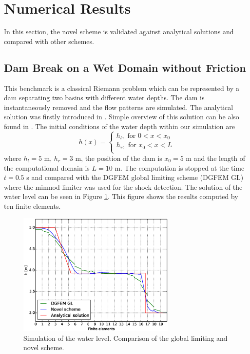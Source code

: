 \section{Numerical Results}
In this section, the novel scheme is validated against analytical solutions and compared with other schemes.

\subsection{Dam Break on a Wet Domain without Friction}\label{DBwet}
This benchmark is a classical Riemann problem which can be represented by a dam separating two basins with different water depths. The dam is instantaneously removed and the flow patterns are simulated. The analytical solution was firstly introduced in \cite{stoker}. Simple overview of this solution can be also found in \cite{swashe}. The initial conditions of the water depth within our simulation are 
\begin{equation}
h(x)=\begin{cases}
h_l, \text{ for } 0<x<x_0\\
h_r, \text{ for } x_0<x<L\\
\end{cases}
\end{equation}
where $h_l=5$ m, $h_r=3$ m, the position of the dam is $x_0=5$ m and the length of the computational domain is $L=10$ m. The computation is stopped at the time $t=0.5$ s and compared with the DGFEM global limiting scheme (DGFEM GL) where the minmod limiter was used for the shock detection. The solution of the water level can be seen in Figure \ref{shock}. This figure shows the results computed by ten finite elements. 
\begin{figure}
\centering
\includegraphics[width=0.7\textwidth]{OBR/shock.eps}
\caption{Simulation of the water level. Comparison of the global limiting and novel scheme.}\label{shock}
\end{figure}
